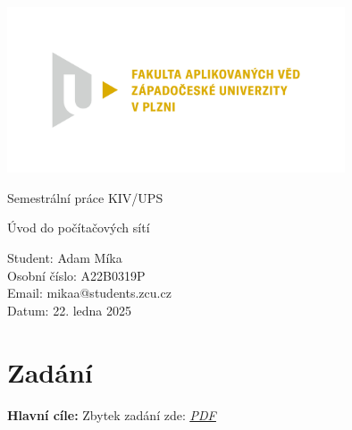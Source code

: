 \documentclass[12pt, a4paper]{article}
\begin{document}
\begin{titlepage}
    \includegraphics[width=0.75\textwidth]{img/fav.png}
    \begin{center}


        \vspace{2cm}

        \Huge
        Semestrální práce KIV/UPS

        \vspace{1cm}

        \LARGE
        Úvod do počítačových sítí

        \vfill

        \vspace{0.5cm}

        \normalsize
        \raggedright
        Student:        Adam Míka \\
        Osobní číslo:   A22B0319P \\
        Email:          mikaa@students.zcu.cz \\
        Datum:          22. ledna 2025
        \vspace{0.2cm}

    \end{center}
\end{titlepage}

\renewcommand{\cftsecleader}{\cftdotfill{\cftdotsep}}
\renewcommand{\cftsubsecleader}{\cftdotfill{\cftdotsep}}
\renewcommand{\cftsubsubsecleader}{\cftdotfill{\cftdotsep}}

\setcounter{page}{2}
\tableofcontents
\listoffigures
\lstlistoflistings
\begin{thebibliography}{99}
  \end{thebibliography}
\pagebreak


\section{Zadání}
\large
\textbf{Hlavní cíle:}
\normalsize
Zbytek zadání zde: \href{https://home.zcu.cz/~ublm/files/PozadavkyUPS.pdf}{\textcolor[RGB]{20,20,200}{\underline{\textit{PDF}}}}
\end{document}

